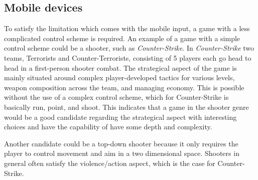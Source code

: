\subsection{Mobile devices}\label{sec:selectionofgametype:mobiledevices}
To satisfy the limitation which comes with the mobile input, a game with a less complicated control scheme is required.
An example of a game with a simple control scheme could be a shooter, such as \textit{Counter-Strike}.\cite{counterstrike}
In \textit{Counter-Strike} two teams, Terrorists and Counter-Terrorists,
consisting of 5 players each go head to head in a first-person shooter combat.
The strategical aspect of the game is mainly situated around complex
player-developed tactics for various levels, weapon composition across the
team, and managing economy. This is possible without the use of a complex
control scheme, which for Counter-Strike is basically run, point, and shoot.
This indicates that a game in the shooter genre would
be a good candidate regarding the strategical aspect with interesting choices
and have the capability of have some depth and complexity.

Another candidate could be a top-down shooter because it only requires the
player to control movement and aim in a two dimensional space. Shooters in
general often satisfy the violence/action aspect, which is the case for
Counter-Strike.

